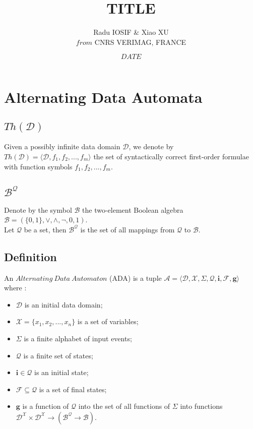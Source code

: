 \documentclass[a4paper, 11pt]{article}
\title{TITLE}
\author{Radu IOSIF \& Xiao XU \\
	$from$ CNRS VERIMAG, FRANCE}
\date{$DATE$}
\begin{document}
 

\maketitle

\section{Alternating Data Automata}

	\subsection{$Th(\mathcal{D})$}

	Given a possibly infinite data domain $\mathcal{D}$, we denote by $Th(\mathcal{D}) = \langle \mathcal{D}, f_1, f_2, ..., f_m \rangle$ the set of syntactically correct first-order formulae with function symbols $f_1, f_2, ..., f_m$.
	
	\subsection{$\mathcal{B}^{\mathcal{Q}}$}
	
	Denote by the symbol $\mathcal{B}$ the two-element Boolean algebra $\mathcal{B} = (\{ 0, 1 \}, \lor, \land, \lnot, 0, 1)$.\\
	
	Let $\mathcal{Q}$ be a set, then $\mathcal{B}^{\mathcal{Q}}$ is the set of all mappings from $\mathcal{Q}$ to $\mathcal{B}$.

	\subsection{Definition}

	An $Alternating\ Data\ Automaton$ (ADA) is a tuple $\mathcal{A} = \langle \mathcal{D}, \mathcal{X}, \Sigma, \mathcal{Q}, \bm{i}, \mathcal{F}, \bm{g} \rangle$ where \cite{HoFL}:
	\begin{itemize}
		\item $\mathcal{D}$ is an initial data domain;
		\item $\mathcal{X} = \{ x_1, x_2, ..., x_n \}$ is a set of variables;
		\item $\Sigma$ is a finite alphabet of input events;
		\item $\mathcal{Q}$ is a finite set of states;
		\item $\bm{i} \in \mathcal{Q}$ is an initial state;
		\item $\mathcal{F} \subseteq \mathcal{Q}$ is a set of final states;
		\item $\bm{g}$ is a function of $\mathcal{Q}$ into the set of all functions of $\Sigma$ into functions $\mathcal{D}^{\mathcal{X}} \times \mathcal{D}^{\mathcal{X}} \to ( \mathcal{B}^{\mathcal{Q}} \to \mathcal{B} )$.\\
	\end{itemize}
	
\end{document}
